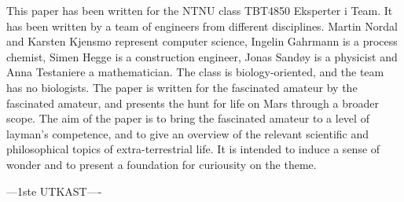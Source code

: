 This paper has been written for the NTNU class TBT4850 Eksperter i Team. It has been written by a team of engineers from different disciplines. Martin Nordal and Karsten Kjensmo represent computer science, Ingelin Gahrmann is a process chemist, Simen Hegge is a construction engineer, Jonas Sandøy is a physicist and Anna Testaniere a mathematician. The class is biology-oriented, and the team has no biologists. The paper is written for the fascinated amateur by the fascinated amateur, and presents the hunt for life on Mars through a broader scope. The aim of the paper is to bring the fascinated amateur to a level of layman's competence, and to give an overview of the relevant scientific and philosophical topics of extra-terrestrial life. It is intended to induce a sense of wonder and to present a foundation for curiousity on the theme. 

---1ste UTKAST----